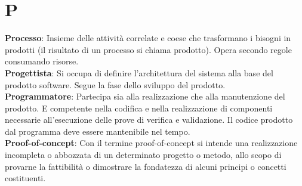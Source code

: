 \section{P}
\textbf{Processo}: Insieme delle attività correlate e coese che trasformano i bisogni in prodotti (il risultato di un processo si
chiama prodotto). Opera secondo regole consumando risorse.\\
\textbf{Progettista}: Si occupa di definire l'architettura del sistema alla base del prodotto software. Segue la fase dello sviluppo del prodotto.\\
\textbf{Programmatore}: Partecipa sia alla realizzazione che alla manutenzione del prodotto. E competente nella codifica e nella realizzazione di componenti necessarie all’esecuzione delle prove di verifica e validazione. Il codice prodotto dal
programma deve essere mantenibile nel tempo.\\
\textbf{Proof-of-concept}: Con il termine proof-of-concept si intende una realizzazione incompleta o abbozzata di un determinato progetto o metodo, allo scopo di provarne la fattibilità o dimostrare la fondatezza di alcuni principi o concetti costituenti.\\
